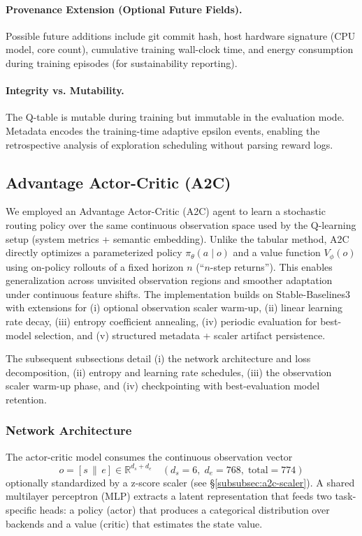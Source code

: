 \paragraph{Provenance Extension (Optional Future Fields).}
Possible future additions include git commit hash, host hardware signature (CPU model, core count), cumulative training wall-clock time, and energy consumption during training episodes (for sustainability reporting).

\paragraph{Integrity vs. Mutability.}
The Q-table is mutable during training but immutable in the evaluation mode. Metadata encodes the training-time adaptive epsilon events, enabling the retrospective analysis of exploration scheduling without parsing reward logs.

\subsection{Advantage Actor-Critic (A2C)}
\label{subsec:a2c}

We employed an Advantage Actor-Critic (A2C) agent to learn a stochastic routing policy over the same continuous observation space used by the Q-learning setup (system metrics + semantic embedding). Unlike the tabular method, A2C directly optimizes a parameterized policy $\pi_{\theta}(a \mid o)$ and a value function $V_{\phi}(o)$ using on-policy rollouts of a fixed horizon $n$ (``$n$-step returns''). This enables generalization across unvisited observation regions and smoother adaptation under continuous feature shifts. The implementation builds on Stable-Baselines3 with extensions for (i) optional observation scaler warm-up, (ii) linear learning rate decay, (iii) entropy coefficient annealing, (iv) periodic evaluation for best-model selection, and (v) structured metadata + scaler artifact persistence.

The subsequent subsections detail (i) the network architecture and loss decomposition, (ii) entropy  and learning rate schedules, (iii) the observation scaler warm-up phase, and (iv) checkpointing with best-evaluation model retention.
\subsubsection{Network Architecture}
\label{subsubsec:a2c-architecture}

The actor-critic model consumes the continuous observation vector
\[
o = [s \,\|\, e] \in \mathbb{R}^{d_s + d_e} \quad (d_s=6,\; d_e=768,\; \text{total}=774)
\]
optionally standardized by a z-score scaler (see \S\ref{subsubsec:a2c-scaler}). A shared multilayer perceptron (MLP) extracts a latent representation that feeds two task-specific heads: a policy (actor) that produces a categorical distribution over backends and a value (critic) that estimates the state value.

